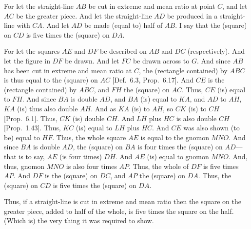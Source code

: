 \begin{Parallel}{}{}
{\epsfysize=2.5in
\centerline{}

For let the straight-line $AB$ be cut in extreme and mean ratio at
point $C$, and let $AC$ be the greater piece. And let the straight-line
$AD$ be produced in a straight-line with $CA$. And let
$AD$ be made (equal to) half of $AB$. I say that the (square) on
$CD$ is five times the (square) on $DA$. 

For let the squares $AE$ and $DF$ be described on $AB$ and
$DC$ (respectively). And let the figure in $DF$ be drawn.  
And let $FC$ be drawn across to $G$. And since $AB$ has been
cut in extreme and mean ratio at $C$, the (rectangle
contained) by $ABC$ is thus equal to the (square) on $AC$ [Def.~6.3, Prop.~6.17].
And  $CE$ is the (rectangle contained) by $ABC$, and $FH$ the
(square) on $AC$. Thus, $CE$ (is) equal to $FH$. 
And since $BA$ is double $AD$, and $BA$ (is) equal to $KA$,
and $AD$ to $AH$, $KA$ (is) thus also double $AH$. 
And as $KA$ (is) to $AH$, so $CK$ (is) to $CH$ [Prop.~6.1].
Thus, $CK$ (is) double $CH$. And $LH$ plus $HC$ is also double $CH$
[Prop.~1.43].  Thus, $KC$ (is) equal to $LH$ plus $HC$. And
$CE$ was also shown (to be) equal to $HF$. Thus, the whole square
$AE$ is equal to the gnomon $MNO$. And since $BA$ is double
$AD$, the (square) on $BA$ is four times the (square) on $AD$---that
is to say, $AE$ (is four times) $DH$. And $AE$ (is) equal to
gnomon $MNO$. And, thus, gnomon $MNO$ is also four times $AP$. 
Thus, the whole of $DF$ is five times $AP$. And $DF$ is the (square)
on $DC$, and $AP$ the (square) on $DA$. Thus, the
(square) on $CD$ is five times the (square) on $DA$. 

Thus, if a straight-line is cut in extreme and mean ratio then the square on the
greater piece, added to half of the whole, is five times the square
on the half. (Which is) the very thing it was required to show.\\}
\end{Parallel}

